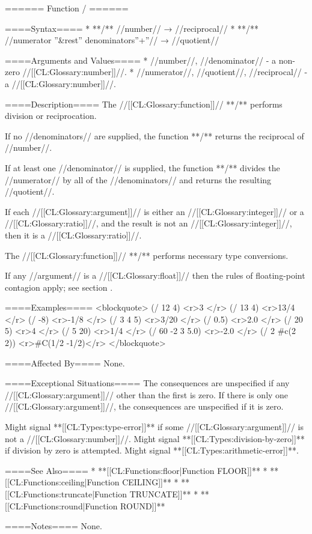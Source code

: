 ====== Function / ======

====Syntax====
  * **/** //number// → //reciprocal// 
  * **/** //numerator ''&rest'' denominators''+''// → //quotient//

====Arguments and Values====
  * //number//, //denominator// - a non-zero //[[CL:Glossary:number]]//.
  * //numerator//, //quotient//, //reciprocal// - a //[[CL:Glossary:number]]//.

====Description====
The //[[CL:Glossary:function]]// **/** performs division or reciprocation.

If no //denominators// are supplied, the function **/** returns the reciprocal of //number//.

If at least one //denominator// is supplied, the function **/** divides the //numerator// by all of the //denominators// and returns the resulting //quotient//.

If each //[[CL:Glossary:argument]]// is either an //[[CL:Glossary:integer]]// or a //[[CL:Glossary:ratio]]//, and the result is not an //[[CL:Glossary:integer]]//, then it is a //[[CL:Glossary:ratio]]//.

The //[[CL:Glossary:function]]// **/** performs necessary type conversions.

If any //argument// is a //[[CL:Glossary:float]]// then the rules of floating-point contagion apply; see section {\secref\FloatingPointComputations}.

====Examples====
<blockquote> 
(/ 12 4) <r>3 </r>
(/ 13 4) <r>13/4 </r>
(/ -8) <r>-1/8 </r>
(/ 3 4 5) <r>3/20 </r>
(/ 0.5) <r>2.0 </r>
(/ 20 5) <r>4 </r>
(/ 5 20) <r>1/4 </r>
(/ 60 -2 3 5.0) <r>-2.0 </r>
(/ 2 #c(2 2)) <r>#C(1/2 -1/2)</r>
</blockquote>

====Affected By====
None.

====Exceptional Situations====
The consequences are unspecified if any //[[CL:Glossary:argument]]// other than the first is zero. If there is only one //[[CL:Glossary:argument]]//, the consequences are unspecified if it is zero.

Might signal **[[CL:Types:type-error]]** if some //[[CL:Glossary:argument]]// is not a //[[CL:Glossary:number]]//. Might signal **[[CL:Types:division-by-zero]]** if division by zero is attempted. Might signal **[[CL:Types:arithmetic-error]]**.

====See Also====
  * **[[CL:Functions:floor|Function FLOOR]]**
  * **[[CL:Functions:ceiling|Function CEILING]]**
  * **[[CL:Functions:truncate|Function TRUNCATE]]**
  * **[[CL:Functions:round|Function ROUND]]**

====Notes====
None.

